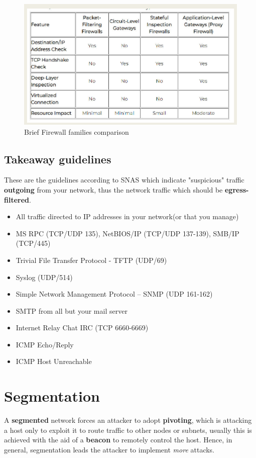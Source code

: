 \begin{figure}[ht]
   \centering
   \includegraphics{images/firewall_comparison.png}
   \caption{Brief Firewall families comparison}
   \label{fig:firewall_comparison}
\end{figure}

\subsection{Takeaway guidelines}
These are the guidelines according to SNAS which indicate "suspicious" traffic \textbf{outgoing} from your network,
thus the network traffic which should be \textbf{egress-filtered}.
\begin{itemize}
   \item All traffic directed to IP addresses in your network(or that you manage)
   \item MS RPC (TCP/UDP 135), NetBIOS/IP (TCP/UDP 137-139), SMB/IP (TCP/445)
   \item Trivial File Transfer Protocol - TFTP (UDP/69)
   \item Syslog (UDP/514)
   \item Simple Network Management Protocol – SNMP (UDP 161-162)
   \item SMTP from all but your mail server
   \item Internet Relay Chat IRC (TCP 6660-6669)
   \item ICMP Echo/Reply
   \item ICMP Host Unreachable
\end{itemize}

\section{Segmentation}

A \textbf{segmented} network forces an attacker to adopt \textbf{pivoting},
which is attacking a host only to exploit it to route traffic to other nodes or subnets,
usually this is achieved with the aid of a \textbf{beacon} to remotely control the host.
Hence, in general, segmentation leads the attacker to implement \textit{more} attacks.

